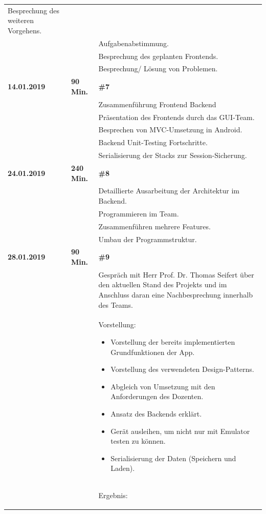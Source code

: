 {\begin{longtable}{|l|l|p{11cm}|}
			Besprechung des weiteren Vorgehens.
			\\ & &
			Aufgabenabstimmung.
			\\ & &
			Besprechung des geplanten Frontends.
			\\ & &
			Besprechung/ Lösung von Problemen.
	\\ \hline
		\textbf{14.01.2019} & \textbf{90 Min.} &
			\textbf{\#7}
			\\ & &
			Zusammenführung Frontend Backend
			\\ & &
			Präsentation des Frontends durch das GUI-Team.
			\\ & &
			Besprechen von MVC-Umsetzung in Android.
			\\ & &
			Backend Unit-Testing Fortschritte.
			\\ & &
			Serialisierung der Stacks zur Session-Sicherung.
	\\ \hline
		\textbf{24.01.2019} & \textbf{240 Min.} &
			\textbf{\#8}
			\\ & &
			Detaillierte Ausarbeitung der Architektur im Backend.
			\\ & &
			Programmieren im Team. 
			\\ & &
			Zusammenführen mehrere Features.
			\\ & &
			Umbau der Programmstruktur.
	\\ \hline
		\textbf{28.01.2019} & \textbf{90 Min.} &
			\textbf{\#9}
			\\ & &
			Gespräch mit Herr Prof. Dr. Thomas Seifert über den aktuellen Stand des Projekts und im Anschluss daran eine Nachbesprechung innerhalb des Teams.
			\\ & &
			Vorstellung:
			\begin{itemize}\renewcommand\labelitemi{--}
				\item Vorstellung der bereits implementierten Grundfunktionen der App.
				\item Vorstellung des verwendeten Design-Patterns.
				\item Abgleich von Umsetzung mit den Anforderungen des Dozenten.
				\item Ansatz des Backends erklärt.
				\item Gerät ausleihen, um nicht nur mit Emulator testen zu können.
				\item Serialisierung der Daten (Speichern und Laden).
			\end{itemize}
			\\ & &
			Ergebnis:
			\begin{itemize}\renewcommand\labelitemi{--}

\end{itemize}
\end{longtable}}
